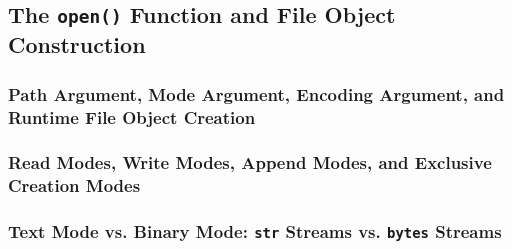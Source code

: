 \subsection{The \texttt{open()} Function and File Object Construction}
\subsubsection{Path Argument, Mode Argument, Encoding Argument, and Runtime File Object Creation}
\subsubsection{Read Modes, Write Modes, Append Modes, and Exclusive Creation Modes}
\subsubsection{Text Mode vs. Binary Mode: \texttt{str} Streams vs. \texttt{bytes} Streams}
